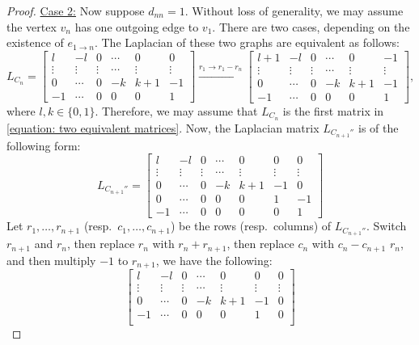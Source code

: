 \documentclass[11pt,reqno]{amsart}
\theoremstyle{definition}
\theoremstyle{plain}
\begin{document}
\begin{proof}
\noindent \underline{Case 2:} Now suppose $d_{nn} = 1$. Without loss of generality, we may assume the vertex $v_n$ has one outgoing edge to $v_1$. 
There are two cases, depending on the existence of $e_{1\to n}$.
The Laplacian of these two graphs are equivalent as follows: 
\begin{equation}\label{equation: two equivalent matrices}
L_{C_n} = \begin{bmatrix}
l  & -l & 0 & \cdots & 0 & 0 \\
	\vdots & \vdots & \vdots & \cdots & \vdots & \vdots  \\
0 & \cdots & 0 & -k & k+1 & -1 \\
-1 & \cdots & 0 & 0 & 0 & 1 
\end{bmatrix}
\stackrel{r_{1}\to r_1  - r_n}\longrightarrow
\begin{bmatrix}
l+1  & -l & 0 & \cdots & 0 & -1 \\
	\vdots & \vdots & \vdots & \cdots & \vdots & \vdots  \\
0 & \cdots & 0 & -k & k+1 & -1 \\
-1 & \cdots & 0 & 0 & 0 & 1 
\end{bmatrix},
\end{equation}
where $l, k \in \{ 0, 1 \}$. Therefore, we may assume that $L_{C_n}$ is the first matrix in \eqref{equation: two equivalent matrices}. Now, the Laplacian matrix $L_{C_{n+1}''}$ is of the following form:
\[
L_{C_{n+1}''}=\begin{bmatrix} 
	l  & -l & 0 & \cdots & 0 & 0 & 0 \\
	\vdots & \vdots & \vdots & \cdots & \vdots & \vdots &\vdots \\
	0 & \cdots & 0 & -k & k+1 & -1 & 0  \\
	0 & \cdots & 0 & 0 & 0 & 1 & -1 \\ 
	-1 & \cdots & 0 & 0 & 0 & 0 & 1 
\end{bmatrix}
\]
Let $r_1,\dots,r_{n+1}$ (resp.~$c_1,\dots,c_{n+1}$) be the rows (resp.~columns) of $L_{C_{n+1}''}$. Switch $r_{n+1}$ and $r_n$, then replace $r_n$ with $r_n+r_{n+1}$, then replace $c_n$ with $c_n-c_{n+1}$ $r_n$, and then multiply $-1$ to $r_{n+1}$, we have the following:
\[
\begin{bmatrix} 
	l  & -l & 0 & \cdots & 0 & 0 & 0 \\
	\vdots & \vdots & \vdots & \cdots & \vdots & \vdots &\vdots \\
	0 & \cdots & 0 & -k & k+1 & -1 & 0  \\
	-1 & \cdots & 0 & 0 & 0 & 1 & 0 \\ 

\end{bmatrix}\]
\end{proof}
\end{document}
